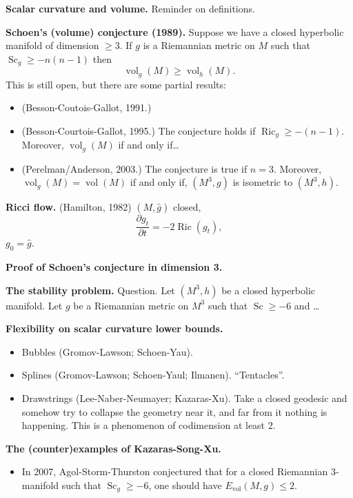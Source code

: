 \medskip\noindent
{\bf Scalar curvature and volume.}
Reminder on definitions.

\medskip\noindent
{\bf Schoen's (volume) conjecture 
(1989).}
Suppose we have a closed hyperbolic manifold
of dimension $\geq  3$. If $g$ is a
Riemannian metric on $M$ such that
$\operatorname{Sc}_g \geq -n(n-1)$
then
$$
\operatorname{vol}_g(M) \geq  
\operatorname{vol}_h(M).
$$
This is still open, but there are some
partial results:
\begin{itemize}
\item (Besson-Coutois-Gallot, 1991.)
\item (Besson-Courtois-Gallot, 1995.) 
The conjecture holds if
$\operatorname{Ric}_g \geq -(n-1)$.
Moreover, $\operatorname{vol}_g(M)$
if and only if…
\item (Perelman/Anderson, 2003.)
The conjecture is true if $n=3$.
Moreover, $\operatorname{vol}_g(M)
= \operatorname{vol}(M)$ if and only if,
$(M^3,g)$ is isometric to $(M^3,h)$.
\end{itemize}

\medskip\noindent
{\bf Ricci flow.}
(Hamilton, 1982)
$(M,\hat{g})$ closed,
$$
\frac{\partial g_t}{\partial t}
=
-2 \operatorname{Ric}(g_t),
$$
$g_0=\hat{g}$.

\medskip\noindent
{\bf Proof of Schoen's conjecture
in dimension 3.}

\medskip\noindent
{\bf The stability problem.}
Question. Let $(M^3,h)$ be a closed
hyperbolic manifold. Let $g$ be a Riemannian
metric on $M^3$ such that
$\operatorname{Sc}\geq -6$ and …

\medskip\noindent
{\bf Flexibility on scalar curvature lower
bounds.}
\begin{itemize}
\item Bubbles (Gromov-Lawson; Schoen-Yau).
\item Splines (Gromov-Lawson;
Schoen-Yaul; Ilmanen). ``Tentacles''.
\item Drawstrings (Lee-Naber-Neumayer;
Kazaras-Xu). Take a closed geodesic
and somehow try to collapse the geometry
near it, and far from it nothing is
happening. This is a phenomenon of
codimension at least 2.
\end{itemize}

\medskip\noindent
{\bf The (counter)examples of
Kazaras-Song-Xu.}
\begin{itemize}
\item In 2007, Agol-Storm-Thurston
conjectured that for a closed Riemannian
3-manifold such that $\operatorname{Sc}_g
\geq  -6$, one should have
$E_{\operatorname{vol}}(M,g) \leq 2$.
\end{itemize}

